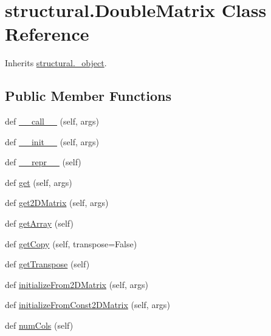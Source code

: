 \hypertarget{classstructural_1_1_double_matrix}{}\section{structural.\+Double\+Matrix Class Reference}
\label{classstructural_1_1_double_matrix}


Inherits \hyperlink{classstructural_1_1__object}{structural.\+\_\+object}.

\subsection*{Public Member Functions}
\begin{DoxyCompactItemize}
\item 
def \hyperlink{classstructural_1_1_double_matrix_a157d540d7b65561999147c4376a964e1}{\+\_\+\+\_\+call\+\_\+\+\_\+} (self, args)
\item 
def \hyperlink{classstructural_1_1_double_matrix_a6131a882a868f04fae0bbe40fd618901}{\+\_\+\+\_\+init\+\_\+\+\_\+} (self, args)
\item 
def \hyperlink{classstructural_1_1_double_matrix_a7b30bbecfebc1ba140788d6fbc2499a8}{\+\_\+\+\_\+repr\+\_\+\+\_\+} (self)
\item 
def \hyperlink{classstructural_1_1_double_matrix_a96748091c0833715cc9ea3ad714cdcca}{get} (self, args)
\item 
def \hyperlink{classstructural_1_1_double_matrix_a6387ff419cfc6c5cd73fc633bbfe8812}{get2\+D\+Matrix} (self, args)
\item 
def \hyperlink{classstructural_1_1_double_matrix_af8b1f96920a94823512f1cbf9fd7cef5}{get\+Array} (self)
\item 
def \hyperlink{classstructural_1_1_double_matrix_a711b2194b9400dd0dd17a7f964518382}{get\+Copy} (self, transpose=False)
\item 
def \hyperlink{classstructural_1_1_double_matrix_adfe6804da98140e74b7f408e92e13631}{get\+Transpose} (self)
\item 
def \hyperlink{classstructural_1_1_double_matrix_a64c6da558a8d780e5620b1cc43a7f615}{initialize\+From2\+D\+Matrix} (self, args)
\item 
def \hyperlink{classstructural_1_1_double_matrix_aff4a866c379293fcbaeced4e4e37bbae}{initialize\+From\+Const2\+D\+Matrix} (self, args)
\item 
def \hyperlink{classstructural_1_1_double_matrix_a61956a9f794569d36fe02c178aca161c}{num\+Cols} (self)
\item 

\end{DoxyCompactItemize}
